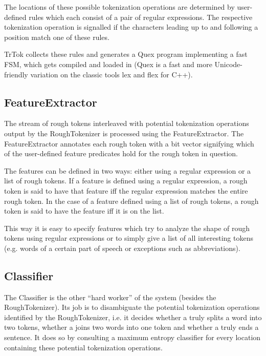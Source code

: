 The locations of these possible tokenization operations are determined
by user-defined rules which each consist of a pair of regular
expressions. The respective tokenization operation is signalled if the
characters leading up to and following a position match one of these
rules.

TrTok collects these rules and generates a Quex program implementing a
fast FSM, which gets compiled and loaded in (Quex is a fast and more
Unicode-friendly variation on the classic tools lex and flex for C++).

\subsection{FeatureExtractor}

The stream of rough tokens interleaved with potential tokenization
operations output by the RoughTokenizer is processed using the
FeatureExtractor. The FeatureExtractor annotates each rough token with
a bit vector signifying which of the user-defined feature predicates
hold for the rough token in question.

The features can be defined in two ways: either using a regular
expression or a list of rough tokens. If a feature is defined using a
regular expression, a rough token is said to have that feature iff the
regular expression matches the entire rough token. In the case of a
feature defined using a list of rough tokens, a rough token is said to
have the feature iff it is on the list.

This way it is easy to specify features which try to analyze the shape
of rough tokens using regular expressions or to simply give a list of
all interesting tokens (e.g. words of a certain part of speech or
exceptions such as abbreviations).

\subsection{Classifier}

The Classifier is the other ``hard worker'' of the system (besides the
RoughTokenizer). Its job is to disambiguate the potential tokenization
operations identified by the RoughTokenizer, i.e. it decides whether a
\maysplit{} truly splits a word into two tokens, whether a \mayjoin{}
joins two words into one token and whether a \maybreaksentence{} truly
ends a sentence. It does so by consulting a maximum entropy classifier
for every location containing these potential tokenization operations.

